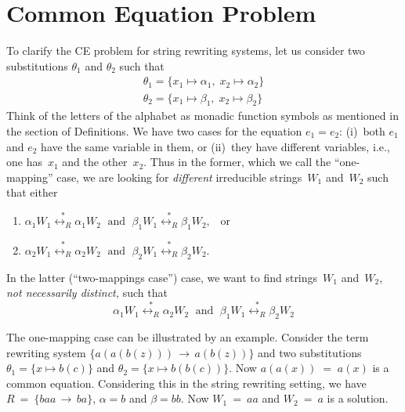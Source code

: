 \documentclass{lmcs} %
\theoremstyle{plain}\newtheorem{satz}[thm]{Satz} %
\begin{document}
\section{Common Equation Problem}\label{S:CE}
To clarify the CE problem for string rewriting systems, let us consider two substitutions 
$\theta^{}_1$ and $\theta^{}_2$ such that
\begin{eqnarray*}
\theta^{}_1 = \{ x_1 \mapsto \alpha^{}_1, \; x_2 \mapsto \alpha^{}_2\} \\
\theta^{}_2 = \{ x_1 \mapsto \beta^{}_1,  \; x_2 \mapsto \beta^{}_2\}
\end{eqnarray*}
Think of the letters of the alphabet as monadic function symbols as
mentioned in the section of Definitions.%
We have two cases for the equation
$e_1 = e_2$: (i)~both $e_1$ and $e_2$ have the same variable in them, or
(ii)~they have different variables, i.e., one has~$x_1$ and the other~$x_2$.
Thus in the former, which we call the ``one-mapping'' case, we are looking for
\emph{different} irreducible strings~$W_1^{}$ and~$W_2^{}$ such that either
\begin{enumerate}
\item $\alpha_1 W_1 \stackrel{*}{{\longleftrightarrow}_R} \alpha_1 W_2 \; \text{ and } \;
  \beta_1 W_1 \stackrel{*}{{\longleftrightarrow}_R} \beta_1 W_2, \; \; \; \text{or}$

\item $\alpha_2 W_1 \stackrel{*}{{\longleftrightarrow}_R} \alpha_2 W_2 \; \text{ and } \;
  \beta_2 W_1 \stackrel{*}{{\longleftrightarrow}_R} \beta_2 W_2$.
\end{enumerate}
In the latter (``two-mappings case'') case, we want to find strings~$W_1^{}$ and~$W_2^{}$,
\emph{not necessarily distinct,} such that \[
\alpha_1 W_1 \stackrel{*}{{\longleftrightarrow}_R} \alpha_2 W_2 \; \text{ and } \;
 \beta_1 W_1 \stackrel{*}{{\longleftrightarrow}_R} \beta_2 W_2 \]

The one-mapping case can be illustrated by an example. Consider the
term rewriting system $\{ a(a(b(z))) \, \rightarrow \, a(b(z)) \}$ and
two substitutions $\theta_1^{} = \{ x \mapsto b(c) \}$ and
$\theta_2^{} = \{ x \mapsto b(b(c)) \}$. Now
$a(a(x)) \; = \; a(x)$ is a common equation. Considering this
in the string rewriting setting, we have  $R ~ = ~ \{ baa \, \rightarrow \, ba \}$,
$\alpha = b$ and $\beta = bb$. Now $W_1 ~ = ~ aa$ and $W_2 ~ = ~ a$ is a solution.\\[-4pt]
\end{document}
